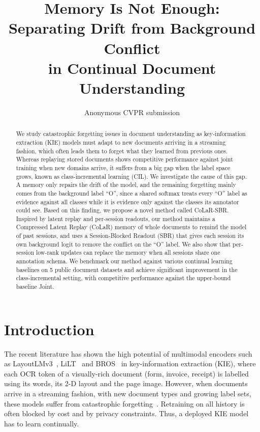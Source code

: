 \documentclass[10pt,twocolumn,letterpaper]{article}
\title{Memory Is Not Enough: Separating Drift from Background Conflict\\in Continual Document Understanding}
\author{Anonymous CVPR submission}
\begin{document}
\maketitle

\begin{abstract}
We study catastrophic forgetting issues in document understanding as key-information extraction (KIE) models must adapt to new documents arriving in a streaming fashion, which often leads them to forget what they learned from previous ones. Whereas replaying stored documents shows competitive performance against joint training when new domains arrive, it suffers from a big gap when the label space grows, known as class-incremental learning (CIL). We investigate the cause of this gap. A memory only repairs the drift of the model, and the remaining forgetting mainly comes from the background label ``O'', since a shared softmax treats every ``O'' label as evidence against all classes while it is evidence only against the classes its annotator could see. Based on this finding, we propose a novel method called CoLaR-SBR. Inspired by latent replay and per-session readouts, our method maintains a Compressed Latent Replay (CoLaR) memory of whole documents to remind the model of past sessions, and uses a Session-Blocked Readout (SBR) that gives each session its own background logit to remove the conflict on the ``O'' label. We also show that per-session low-rank updates can replace the memory when all sessions share one annotation schema. We benchmark our method against various continual learning baselines on 5 public document datasets and achieve significant improvement in the class-incremental setting, with competitive performance against the upper-bound baseline Joint.
\end{abstract}

\section{Introduction}
\label{sec:intro}

The recent literature has shown the high potential of multimodal encoders such as LayoutLMv3~\citep{huang2022layoutlmv3}, LiLT~\citep{wang2022lilt} and BROS~\citep{hong2022bros} in key-information extraction (KIE), where each OCR token of a visually-rich document (form, invoice, receipt) is labelled using its words, its 2-D layout and the page image. However, when documents arrive in a streaming fashion, with new document types and growing label sets, these models suffer from catastrophic forgetting~\citep{mccloskey1989catastrophic}. Retraining on all history is often blocked by cost and by privacy constraints. Thus, a deployed KIE model has to learn continually.
\end{document}

